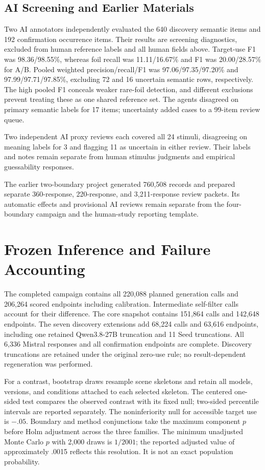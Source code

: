 \subsection{AI Screening and Earlier Materials}
Two AI annotators independently evaluated the 640 discovery semantic items and 192 confirmation occurrence items. Their results are screening diagnostics, excluded from human reference labels and all human fields above. Target-use F1 was 98.36/98.55\%, whereas foil recall was 11.11/16.67\% and F1 was 20.00/28.57\% for A/B. Pooled weighted precision/recall/F1 was 97.06/97.35/97.20\% and 97.99/97.71/97.85\%, excluding 72 and 16 uncertain semantic rows, respectively. The high pooled F1 conceals weaker rare-foil detection, and different exclusions prevent treating these as one shared reference set. The agents disagreed on primary semantic labels for 17 items; uncertainty added cases to a 99-item review queue.

Two independent AI proxy reviews each covered all 24 stimuli, disagreeing on meaning labels for 3 and flagging 11 as uncertain in either review. Their labels and notes remain separate from human stimulus judgments and empirical guessability responses.

The earlier two-boundary project generated 760,508 records and prepared separate 360-response, 220-response, and 3,211-response review packets. Its automatic effects and provisional AI reviews remain separate from the four-boundary campaign and the human-study reporting template.

\section{Frozen Inference and Failure Accounting}
\label{app:accounting}
The completed campaign contains all 220,088 planned generation calls and 206,264 scored endpoints including calibration. Intermediate self-filter calls account for their difference. The core snapshot contains 151,864 calls and 142,648 endpoints. The seven discovery extensions add 68,224 calls and 63,616 endpoints, including one retained Qwen3.8-27B truncation and 11 Seed truncations. All 6,336 Mistral responses and all confirmation endpoints are complete. Discovery truncations are retained under the original zero-use rule; no result-dependent regeneration was performed.

For a contrast, bootstrap draws resample scene skeletons and retain all models, versions, and conditions attached to each selected skeleton. The centered one-sided test compares the observed contrast with its fixed null; two-sided percentile intervals are reported separately. The noninferiority null for accessible target use is ${-}.05$. Boundary and method conjunctions take the maximum component $p$ before Holm adjustment across the three families. The minimum unadjusted Monte Carlo $p$ with 2,000 draws is $1/2001$; the reported adjusted value of approximately .0015 reflects this resolution. It is not an exact population probability.

